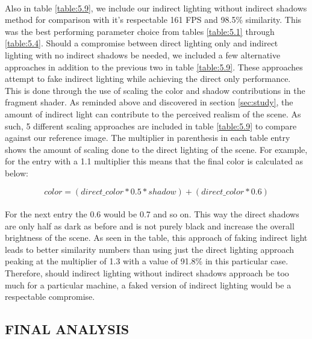 \paragraph{}
Also in table \ref{table:5.9}, we include our indirect lighting without indirect shadows method for comparison with it's respectable 161 FPS and 98.5\% similarity.  This was the best performing parameter choice from tables \ref{table:5.1} through \ref{table:5.4}.  Should a compromise between direct lighting only and indirect lighting with no indirect shadows be needed, we included a few alternative approaches in addition to the previous two in table \ref{table:5.9}.  These approaches attempt to fake indirect lighting while achieving the direct only performance.  This is done through the use of scaling the color and shadow contributions in the fragment shader.  As reminded above and discovered in section \ref{sec:study}, the amount of indirect light can contribute to the perceived realism of the scene.  As such, 5 different scaling approaches are included in table \ref{table:5.9} to compare against our reference image.  The multiplier in parenthesis in each table entry shows the amount of scaling done to the direct lighting of the scene.  For example, for the entry with a 1.1 multiplier this means that the final color is calculated as below:

\begin{equation}
color = (direct\_color*0.5*shadow)+(direct\_color*0.6)
\end{equation}

\paragraph{}
For the next entry the 0.6 would be 0.7 and so on.  This way the direct shadows are only half as dark as before and is not purely black and increase the overall brightness of the scene.  As seen in the table, this approach of faking indirect light leads to better similarity numbers than using just the direct lighting approach peaking at the multiplier of 1.3 with a value of 91.8\% in this particular case.  Therefore, should indirect lighting without indirect shadows approach be too much for a particular machine, a faked version of indirect lighting would be a respectable compromise.

\subsection{FINAL ANALYSIS} \label{sec:finalAnalysis}
